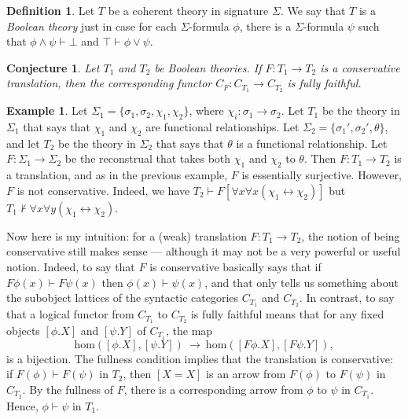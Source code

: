 \documentclass[12pt]{article}
\newtheorem{conj}[prop]{Conjecture}
\theoremstyle{definition}
\newtheorem*{defn}{Definition}
\newtheorem{example}[prop]{Example}
\theoremstyle{remark}
\newcommand{\3}{\mathcal}
\begin{document}
\begin{defn} Let $T$ be a coherent theory in signature $\Sigma$. We
  say that $T$ is a \emph{Boolean theory} just in case for each
  $\Sigma$-formula $\phi$, there is a $\Sigma$-formula $\psi$ such
  that $\phi \wedge \psi \vdash \bot$ and $\top \vdash \phi\vee
  \psi$. \end{defn}

\begin{conj} Let $T_1$ and $T_2$ be Boolean theories. If
  $F:T_1\to T_2$ is a conservative translation, then the corresponding
  functor $C_F:C_{T_1}\to C_{T_2}$ is fully faithful. \end{conj}

\begin{example} Let
  $\Sigma _1 = \{ \sigma _1,\sigma _2,\chi _1,\chi _2\}$, where
  $\chi _i:\sigma _1\to \sigma _2$. Let $T_1$ be the theory in
  $\Sigma _1$ that says that $\chi _1$ and $\chi _2$ are functional
  relationships. Let $\Sigma _2 =\{ \sigma _1',\sigma _2',\theta \}$,
  and let $T_2$ be the theory in $\Sigma _2$ that says that $\theta$
  is a functional relationship. Let $F:\Sigma _1\to \Sigma _2$ be the
  reconstrual that takes both $\chi _1$ and $\chi _2$ to
  $\theta$. Then $F:T_1\to T_2$ is a translation, and as in the
  previous example, $F$ is essentially surjective. However, $F$ is not
  conservative. Indeed, we have
  $T_2\vdash F[\forall x\forall x(\chi _1\leftrightarrow \chi _2)]$
  but
  $T_1\not\vdash \forall x\forall y(\chi _1\leftrightarrow \chi _2)$.
\end{example}

Now here is my intuition: for a (weak) translation $F:T_1\to T_2$, the
notion of being conservative still makes sense --- although it may not
be a very powerful or useful notion. Indeed, to say that $F$ is
conservative basically says that if $F\phi (x)\vdash F\psi (x)$ then
$\phi (x)\vdash\psi (x)$, and that only tells us something about the
subobject lattices of the syntactic categories $C_{T_1}$ and
$C_{T_2}$. In contrast, to say that a logical functor from $C_{T_1}$
to $C_{T_2}$ is fully faithful means that for any fixed objects
$[\phi .X]$ and $[\psi .Y]$ of $C_{T_1}$, the map
\[ \mathrm{hom}\left( [\phi .X] ,[\psi .Y]\right) \: \to \:
  \mathrm{hom}\left( [F\phi .X] ,[F\psi .Y]\right) ,\] is a
bijection. The fullness condition implies that the translation is
conservative: if $F(\phi )\vdash F(\psi )$ in $T_2$, then $[X=X]$ is
an arrow from $F(\phi )$ to $F(\psi )$ in $C_{T_2}$. By the fullness
of $F$, there is a corresponding arrow from $\phi$ to $\psi$ in
$C_{T_1}$. Hence, $\phi\vdash\psi$ in $T_1$.
\end{document}
